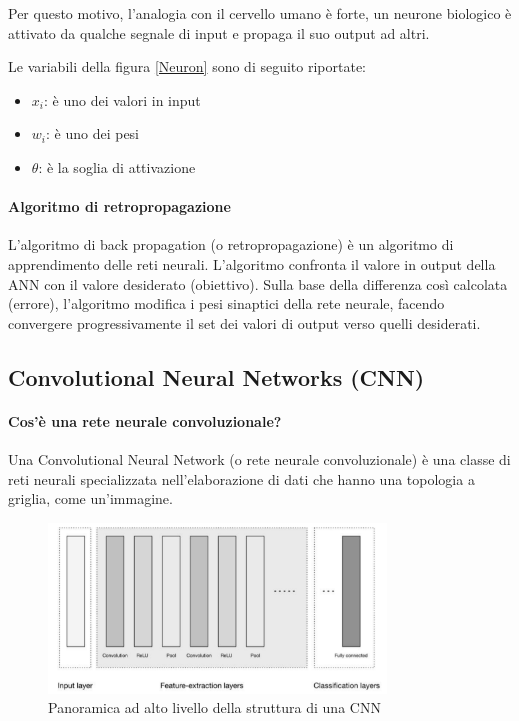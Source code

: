         Per questo motivo, l'analogia con il cervello umano è forte, un neurone biologico è attivato da qualche segnale di input e propaga il suo output ad altri. 
        
        Le variabili della figura \ref{Neuron} sono di seguito riportate:
            \begin{itemize}
                \item $x_i$: è uno dei valori in input
                \item $w_i$: è uno dei pesi
                \item $\theta$: è la soglia di attivazione
            \end{itemize}
        
        \paragraph{Algoritmo di retropropagazione}
        L'algoritmo di back propagation (o retropropagazione) è un algoritmo di apprendimento delle reti neurali. L'algoritmo confronta il valore in output della ANN con il valore desiderato (obiettivo). Sulla base della differenza così calcolata (errore), l'algoritmo modifica i pesi sinaptici della rete neurale, facendo convergere progressivamente il set dei valori di output verso quelli desiderati.
        
    \newpage    
    \subsection{Convolutional Neural Networks (CNN)}
        
        \paragraph{Cos'è una rete neurale convoluzionale?}
        Una Convolutional Neural Network (o rete neurale convoluzionale) è una classe di reti neurali specializzata nell'elaborazione di dati che hanno una topologia a griglia, come un'immagine.\\
            \begin{figure}[!h]
                \centering
                \includegraphics[width=0.8\textwidth]{Images/NN/CNN.png}
                \caption{Panoramica ad alto livello della struttura di una CNN}
                \label{CNN architecture}
            \end{figure}
        
